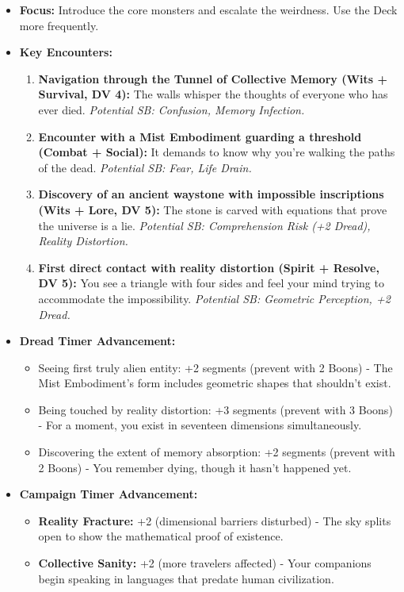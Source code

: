 \documentclass[11pt]{article}
\begin{document}
\begin{itemize}
\item \textbf{Focus:} Introduce the core monsters and escalate the weirdness. Use the Deck more frequently.
\item \textbf{Key Encounters:}
\begin{enumerate}
\item \textbf{Navigation through the Tunnel of Collective Memory (Wits + Survival, DV 4):} The walls whisper the thoughts of everyone who has ever died. \textit{Potential SB: Confusion, Memory Infection.}
\item \textbf{Encounter with a Mist Embodiment guarding a threshold (Combat + Social):} It demands to know why you're walking the paths of the dead. \textit{Potential SB: Fear, Life Drain.}
\item \textbf{Discovery of an ancient waystone with impossible inscriptions (Wits + Lore, DV 5):} The stone is carved with equations that prove the universe is a lie. \textit{Potential SB: Comprehension Risk (+2 Dread), Reality Distortion.}
\item \textbf{First direct contact with reality distortion (Spirit + Resolve, DV 5):} You see a triangle with four sides and feel your mind trying to accommodate the impossibility. \textit{Potential SB: Geometric Perception, +2 Dread.}
\end{enumerate}
\item \textbf{Dread Timer Advancement:}
\begin{itemize}
\item Seeing first truly alien entity: +2 segments (prevent with 2 Boons) - The Mist Embodiment's form includes geometric shapes that shouldn't exist.
\item Being touched by reality distortion: +3 segments (prevent with 3 Boons) - For a moment, you exist in seventeen dimensions simultaneously.
\item Discovering the extent of memory absorption: +2 segments (prevent with 2 Boons) - You remember dying, though it hasn't happened yet.
\end{itemize}
\item \textbf{Campaign Timer Advancement:}
\begin{itemize}
\item \textbf{Reality Fracture:} +2 (dimensional barriers disturbed) - The sky splits open to show the mathematical proof of existence.
\item \textbf{Collective Sanity:} +2 (more travelers affected) - Your companions begin speaking in languages that predate human civilization.
\end{itemize}
\end{itemize}
\end{document}
